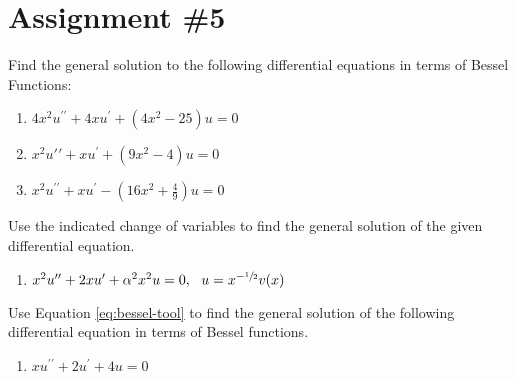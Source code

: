 \chapter{Assignment \#5}
\label{ch:ass5}
\begin{fullwidth}
Find the general solution to the following differential equations in terms of Bessel Functions:
\begin{enumerate}
\item $4x^2u^{\prime \prime} + 4xu^{\prime} + \left(4x^2-25 \right)u = 0$

\vspace{1.0cm}

\item $ x^2u{\prime \prime}+xu^{\prime}+\left(9x^2-4\right)u = 0$

\vspace{1.0cm}

\item $x^2u^{\prime \prime}+xu^{\prime}-\left(16x^2+\frac{4}{9}\right)u = 0$
\end{enumerate}

\vspace{1.0cm}

\noindent Use the indicated change of variables to find the general solution of the given differential equation.
\begin{enumerate}[resume]
\item $x^2u^{\prime\prime}+2xu^{\prime}+\alpha^2x^2u = 0, \ \ u = x^{-\sfrac{1}{2}}v(x) $
\end{enumerate}

\vspace{1.0cm}

\noindent Use Equation \ref{eq:bessel-tool} to find the general solution of the following differential equation in terms of Bessel functions.
\begin{enumerate}[resume]
\item $xu^{\prime \prime} + 2u^{\prime} + 4u = 0$
\end{enumerate}

\end{fullwidth}
